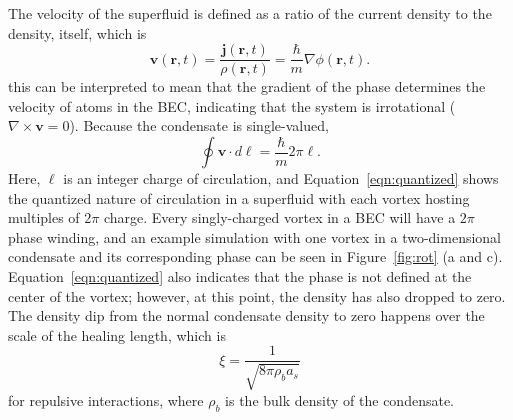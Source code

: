The velocity of the superfluid is defined as a ratio of the current density to the density, itself, which is
\begin{equation}
\mathbf{v}(\mathbf{r},t)=\frac{\mathbf{j}(\mathbf{r},t)}{\rho(\mathbf{r},t)} = \frac{\hbar}{m}\nabla\phi(\mathbf{r},t).
\end{equation}
\noindent this can be interpreted to mean that the gradient of the phase determines the velocity of atoms in the BEC, indicating that the system is irrotational ($\nabla \times \mathbf{v} = 0$).
Because the condensate is single-valued, 
\begin{equation}
\oint \mathbf{v} \cdot d\ell = \frac{\hbar}{m}2\pi\ell.
\label{eqn:quantized}
\end{equation}
\noindent Here, $\ell$ is an integer charge of circulation, and Equation~\eqref{eqn:quantized} shows the quantized nature of circulation in a superfluid with each vortex hosting multiples of $2\pi$ charge.
Every singly-charged vortex in a BEC will have a $2\pi$ phase winding, and an example simulation with one vortex in a two-dimensional condensate and its corresponding phase can be seen in Figure~\ref{fig:rot} (a and c).
Equation~\eqref{eqn:quantized} also indicates that the phase is not defined at the center of the vortex; however, at this point, the density has also dropped to zero.
The density dip from the normal condensate density to zero happens over the scale of the healing length, which is
\begin{equation}
\xi=\frac{1}{\sqrt{8\pi\rho_ba_s}}
\end{equation}
\noindent for repulsive interactions, where $\rho_b$ is the bulk density of the condensate.

